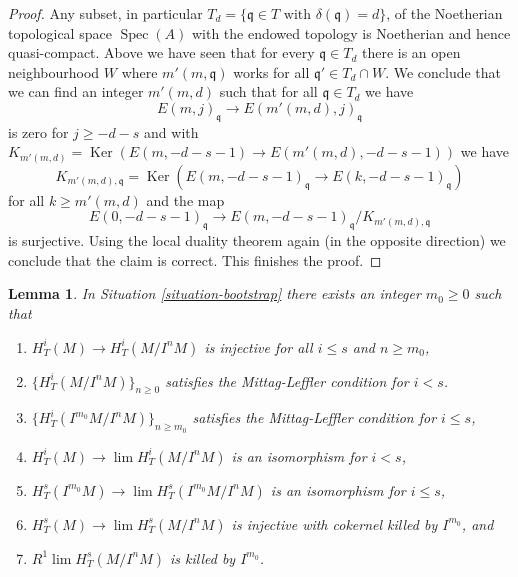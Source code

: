 \documentclass{stacks-project}
\theoremstyle{plain}
\newtheorem{lemma}[subsection]{Lemma}
\theoremstyle{definition}
\theoremstyle{remark}
\numberwithin{equation}{subsection}
\def\lim{\mathop{\mathrm{lim}}\nolimits}
\def\Spec{\mathop{\mathrm{Spec}}}
\def\Ker{\mathop{\mathrm{Ker}}}
\begin{document}
\begin{proof}
\medskip\noindent
Any subset, in particular
$T_d = \{\mathfrak q \in T \text{ with }\delta(\mathfrak q) = d\}$,
of the Noetherian topological space $\Spec(A)$
with the endowed topology is Noetherian and hence quasi-compact.
Above we have seen that for every $\mathfrak q \in T_d$
there is an open neighbourhood $W$ where
$m'(m, \mathfrak q)$ works for all $\mathfrak q' \in T_d \cap W$.
We conclude that we can find an integer $m'(m, d)$ such that for all
$\mathfrak q \in T_d$ we have
$$
E(m, j)_\mathfrak q \to E(m'(m, d), j)_\mathfrak q
$$
is zero for $j \geq -d - s$ and with
$K_{m'(m, d)} = \Ker(E(m, -d - s - 1) \to E(m'(m, d), -d - s - 1))$
we have
$$
K_{m'(m, d), \mathfrak q} =
\Ker(E(m, -d - s - 1)_{\mathfrak q} \to E(k, -d - s - 1)_{\mathfrak q})
$$
for all $k \geq m'(m, d)$ and the map
$$
E(0, -d - s - 1)_\mathfrak q \to
E(m, -d - s - 1)_\mathfrak q/K_{m'(m, d), \mathfrak q}
$$
is surjective. Using the local duality theorem again (in the opposite
direction) we conclude that the claim is correct. This finishes the proof.
\end{proof}

\begin{lemma}
\label{lemma-final-bootstrap}
In Situation \ref{situation-bootstrap} there exists an integer $m_0 \geq 0$
such that
\begin{enumerate}
\item $H^i_T(M) \to H^i_T(M/I^nM)$ is injective for all $i \leq s$
and $n \geq m_0$,
\item $\{H^i_T(M/I^nM)\}_{n \geq 0}$
satisfies the Mittag-Leffler condition for $i < s$.
\item $\{H^i_T(I^{m_0}M/I^nM)\}_{n \geq m_0}$
satisfies the Mittag-Leffler condition for $i \leq s$,
\item $H^i_T(M) \to \lim H^i_T(M/I^nM)$
is an isomorphism for $i < s$,
\item $H^s_T(I^{m_0}M) \to \lim H^s_T(I^{m_0}M/I^nM)$
is an isomorphism for $i \leq s$,
\item $H^s_T(M) \to \lim H^s_T(M/I^nM)$ is
injective with cokernel killed by $I^{m_0}$, and
\item $R^1\lim H^s_T(M/I^nM)$ is killed by $I^{m_0}$.
\end{enumerate}
\end{lemma}
\end{document}
